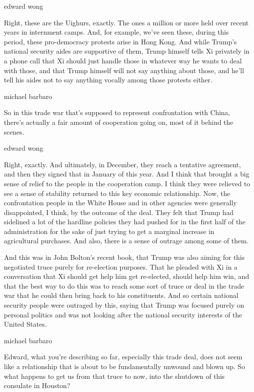 edward wong

Right, these are the Uighurs, exactly. The ones a million or more held
over recent years in internment camps. And, for example, we've seen
these, during this period, these pro-democracy protests arise in Hong
Kong. And while Trump's national security aides are supportive of them,
Trump himself tells Xi privately in a phone call that Xi should just
handle those in whatever way he wants to deal with those, and that Trump
himself will not say anything about those, and he'll tell his aides not
to say anything vocally among those protests either.

michael barbaro

So in this trade war that's supposed to represent confrontation with
China, there's actually a fair amount of cooperation going on, most of
it behind the scenes.

edward wong

Right, exactly. And ultimately, in December, they reach a tentative
agreement, and then they signed that in January of this year. And I
think that brought a big sense of relief to the people in the
cooperation camp. I think they were relieved to see a sense of stability
returned to this key economic relationship. Now, the confrontation
people in the White House and in other agencies were generally
disappointed, I think, by the outcome of the deal. They felt that Trump
had sidelined a lot of the hardline policies they had pushed for in the
first half of the administration for the sake of just trying to get a
marginal increase in agricultural purchases. And also, there is a sense
of outrage among some of them.

And this was in John Bolton's recent book, that Trump was also aiming
for this negotiated truce purely for re-election purposes. That he
pleaded with Xi in a conversation that Xi should get help him get
re-elected, should help him win, and that the best way to do this was to
reach some sort of truce or deal in the trade war that he could then
bring back to his constituents. And so certain national security people
were outraged by this, saying that Trump was focused purely on personal
politics and was not looking after the national security interests of
the United States.

michael barbaro

Edward, what you're describing so far, especially this trade deal, does
not seem like a relationship that is about to be fundamentally unwound
and blown up. So what happens to get us from that truce to now, into the
shutdown of this consulate in Houston?

